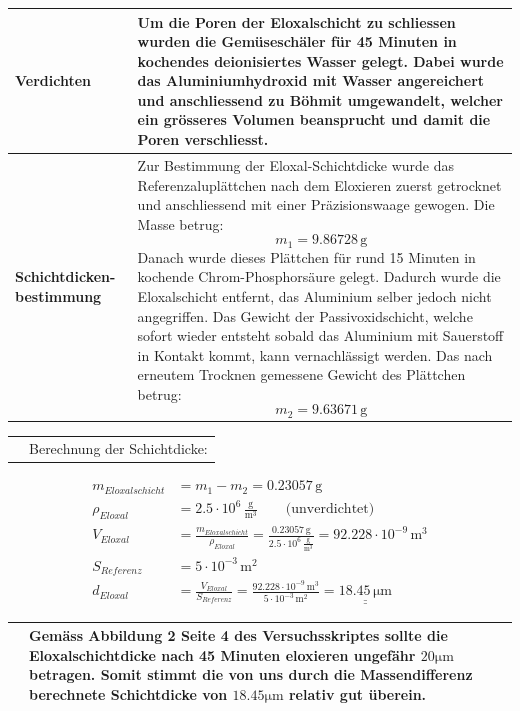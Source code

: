 \begin{longtable}{p{3cm}p{14cm}}
    \textbf{Verdichten}
    & Um die Poren der Eloxalschicht zu schliessen wurden die Gemüseschäler für 45 Minuten in kochendes deionisiertes Wasser gelegt. Dabei wurde das Aluminiumhydroxid mit Wasser angereichert und anschliessend zu Böhmit umgewandelt, welcher ein grösseres Volumen beansprucht und damit die Poren verschliesst.\\
    \hline
    
    \textbf{Schichtdicken-bestimmung}
    & Zur Bestimmung der Eloxal-Schichtdicke wurde das Referenzaluplättchen nach dem Eloxieren zuerst getrocknet und anschliessend mit einer Präzisionswaage gewogen. Die Masse betrug: $$ m_1 = 9.86728 \, \mathrm{g}$$
    Danach wurde dieses Plättchen für rund 15 Minuten in kochende Chrom-Phosphorsäure gelegt. Dadurch wurde die Eloxalschicht entfernt, das Aluminium selber jedoch nicht angegriffen. Das Gewicht der Passivoxidschicht, welche sofort wieder entsteht sobald das Aluminium mit Sauerstoff in Kontakt kommt, kann vernachlässigt werden. Das nach erneutem Trocknen gemessene Gewicht des Plättchen betrug: $$ m_2 = 9.63671 \, \mathrm{g}$$\\
\end{longtable}

\newpage

\begin{longtable}{p{3cm}p{14cm}}

		& Berechnung der Schichtdicke:\\
\end{longtable}
    $$ \begin{aligned}
            m_{Eloxalschicht} &= m_1 - m_2 = 0.23057 \, \mathrm{g}\\
            \rho_{Eloxal} &= 2.5\cdot 10^{6} \, \frac{\mathrm{g}}{\mathrm{m}^3} \qquad \text{(unverdichtet)}\\
            V_{Eloxal} &= \frac{m_{Eloxalschicht}}{\rho_{Eloxal}} = \frac{0.23057 \, \mathrm{g}}{2.5\cdot 10^{6} \, \frac{\mathrm{g}}{\mathrm{m}^3}} = 92.228 \cdot 10^{-9} \, \mathrm{m^3}\\
            S_{Referenz} &= 5 \cdot 10^{-3} \, \mathrm{m^2}\\
            d_{Eloxal} &= \frac{V_{Eloxal}}{S_{Referenz}} = \frac{92.228 \cdot 10^{-9} \, \mathrm{m^3}}{5 \cdot 10^{-3} \, \mathrm{m^2}}= \underline{\underline{18.45 \, \mathrm{\mu m}}}
       \end{aligned}$$
       
\begin{longtable}{p{3cm}p{14cm}}
    & Gemäss Abbildung 2 Seite 4 des Versuchsskriptes sollte die Eloxalschichtdicke nach 45 Minuten eloxieren ungefähr $20 \mathrm{\mu m}$ betragen. Somit stimmt die von uns durch die Massendifferenz berechnete Schichtdicke von $18.45 \mathrm{\mu m}$ relativ gut überein.\\
    \hline
\end{longtable}

